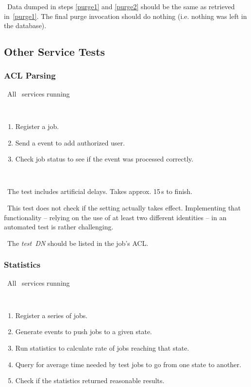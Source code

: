 \result\ Data dumped in steps \ref{purge1} and \ref{purge2} should be the
same as retrieved in~\ref{purge1}. The final purge invocation should
do nothing (i.e. nothing was left in the database).


\subsection{Other Service Tests}

\subsubsection{ACL Parsing}

\req\ All \LB\ services running

\what\
\begin{enumerate}
\item Register a job.
\item Send a  event to add authorized user.
\item Check job status to see if the event was processed correctly.
\end{enumerate}

\how\ 

\note\ The test includes artificial delays. Takes approx. 15\,s to finish.

\note\ This test does not check if the setting actually takes effect. Implementing that functionality -- relying on the use of at least two different identities -- in an automated test is rather challenging. 

\result\ The \emph{test~DN} should be listed in the job's ACL.

\subsubsection{Statistics}

\req\ All \LB\ services running

\what\
\begin{enumerate}
\item Register a series of jobs.
\item Generate events to push jobs to a given state.
\item Run statistics to calculate rate of jobs reaching that state. 
\item Query for average time needed by test jobs to go from one state to another.
\item Check if the statistics returned reasonable results. 
\end{enumerate}

